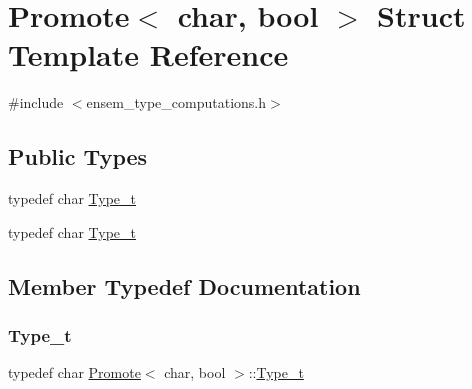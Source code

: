 \hypertarget{structPromote_3_01char_00_01bool_01_4}{}\section{Promote$<$ char, bool $>$ Struct Template Reference}
\label{structPromote_3_01char_00_01bool_01_4}


{\ttfamily \#include $<$ensem\+\_\+type\+\_\+computations.\+h$>$}

\subsection*{Public Types}
\begin{DoxyCompactItemize}
\item 
typedef char \mbox{\hyperlink{structPromote_3_01char_00_01bool_01_4_a8b53bc79ca8fc3ead19479e121877c8f}{Type\+\_\+t}}
\item 
typedef char \mbox{\hyperlink{structPromote_3_01char_00_01bool_01_4_a8b53bc79ca8fc3ead19479e121877c8f}{Type\+\_\+t}}
\end{DoxyCompactItemize}


\subsection{Member Typedef Documentation}
\mbox{\label{structPromote_3_01char_00_01bool_01_4_a8b53bc79ca8fc3ead19479e121877c8f}} 
\subsubsection{\texorpdfstring{Type\_t}{Type\_t}\hspace{0.1cm}{\footnotesize\ttfamily [1/2]}}
{\footnotesize\ttfamily typedef char \mbox{\hyperlink{structPromote}{Promote}}$<$ char, bool $>$\+::\mbox{\hyperlink{structPromote_3_01char_00_01bool_01_4_a8b53bc79ca8fc3ead19479e121877c8f}{Type\+\_\+t}}}

\mbox{\label{structPromote_3_01char_00_01bool_01_4_a8b53bc79ca8fc3ead19479e121877c8f}} 
